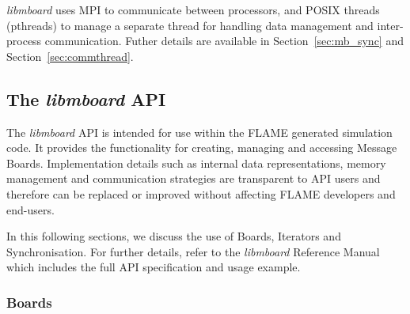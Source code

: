 \textit{libmboard} uses MPI to communicate between processors, and POSIX threads (pthreads) to manage a separate thread for handling data management and inter-process communication. Futher details are available in Section~\ref{sec:mb_sync} and Section~\ref{sec:commthread}.

\subsection{The \textit{libmboard} API}
\label{sec:mb_api}


The  \textit{libmboard} API is intended for use within the FLAME generated simulation code. It provides the functionality for creating, managing and accessing Message Boards. Implementation details such as internal data representations, memory management and communication strategies are transparent to API users and therefore can be replaced or improved without affecting FLAME developers and end-users.

In this following sections, we discuss the use of Boards, Iterators and Synchronisation. For further details, refer to the \textit{libmboard} Reference Manual\cite{MessageBoardAPI} which includes the full API specification and usage example.


\subsubsection{Boards}

